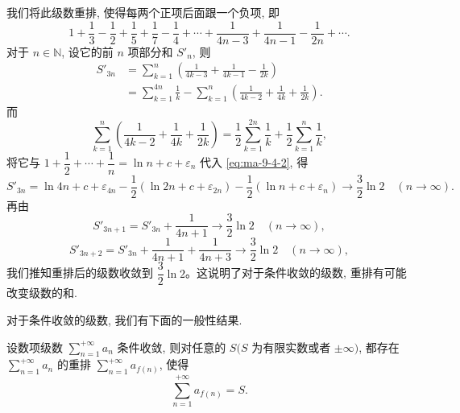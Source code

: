 我们将此级数重排, 使得每两个正项后面跟一个负项, 即
\[
  1+\frac13-\frac12+\frac15+\frac17-\frac14+\cdots+\frac1{4n-3}+\frac1{4n-1}-\frac1{2n}+\cdots.
\]
对于 $n\in\mathbb{N}$, 设它的前 $n$ 项部分和 $S'_n$, 则
\begin{equation}
\begin{aligned}
  S'_{3n}
  &=\sum_{k=1}^n\left(\frac1{4k-3}+\frac1{4k-1}-\frac1{2k}\right)\\
  &=\sum_{k=1}^{4n}\frac1k-\sum_{k=1}^n\left(\frac1{4k-2}+\frac1{4k}+\frac1{2k}\right).
\end{aligned}
  \label{eq:ma-9-4-2}
\end{equation}
而
\[
  \sum_{k=1}^n\left(\frac1{4k-2}+\frac1{4k}+\frac1{2k}\right)
  =\frac12\sum_{k=1}^{2n}\frac1k+\frac12\sum_{k=1}^n\frac1k,
\]
将它与 $1+\dfrac12+\cdots+\dfrac1n=\ln n+c+\varepsilon_n$ 代入 \eqref{eq:ma-9-4-2}, 得
\[
  S'_{3n}
  =\ln4n+c+\varepsilon_{4n}
  -\frac12(\ln2n+c+\varepsilon_{2n})
  -\frac12(\ln n+c+\varepsilon_n)\to\frac32\ln2\quad(n\to\infty).
\]
再由
\[
  S'_{3n+1}=S'_{3n}+\frac1{4n+1}\to\frac32\ln2\quad(n\to\infty),
\]
\[
  S'_{3n+2}=S'_{3n}+\frac1{4n+1}+\frac1{4n+3}\to\frac32\ln2\quad(n\to\infty),
\]
我们推知重排后的级数收敛到 $\dfrac32\ln2$。这说明了对于条件收敛的级数, 重排有可能改变级数的和.

对于条件收敛的级数, 我们有下面的一般性结果.

\begin{theorem}[{黎曼定理}]\label{theorem:ma-9-4-4}
设数项级数 $\sum\limits_{n=1}^{+\infty}a_n$ 条件收敛, 则对任意的 $S(S$ 为有限实数或者 $\pm\infty)$, 都存在 $\sum\limits_{n=1}^{+\infty}a_n$ 的重排 $\sum\limits_{n=1}^{+\infty}a_{f(n)}$, 使得
\[
  \sum_{n=1}^{+\infty}a_{f(n)}=S.
\]
\end{theorem}


